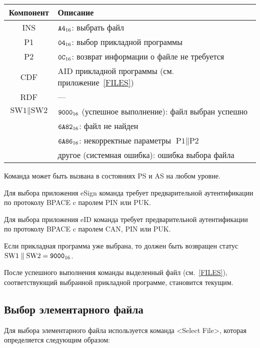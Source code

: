 \noindent
\begin{tabular}{|c|p{14cm}|}
\hline
Компонент & Описание \\
\hline
\hline
INS & $\texttt{A4}_{16}$: выбрать файл\\ 
\hline
P1 & $\texttt{04}_{16}$: выбор прикладной программы\\
\hline
P2 & $\texttt{0C}_{16}$: возврат информации о файле не требуется \\
\hline
CDF & AID прикладной программы (см. приложение~\ref{FILES})\\
\hline \hline
RDF &  --- \\
\hline
$\text{SW1}\parallel\text{SW2}$ & 
$\texttt{9000}_{16}$ (успешное выполнение): файл выбран успешно\\
 & $\texttt{6A82}_{16}$: файл не найден\\
 & $\texttt{6A86}_{16}$: некорректные параметры $\text{P1} \parallel \text{P2}$ \\
 & другое (системная ошибка): ошибка выбора файла\\
\hline
\end{tabular}

Команда может быть вызвана в состояниях PS и AS
на любом уровне.

Для выбора приложения eSign команда требует 
предварительной аутентификации по протоколу 
BPACE c паролем PIN или PUK.

Для выбора приложения eID команда требует 
предварительной аутентификации по протоколу BPACE c 
паролем CAN, PIN или PUK.

Если прикладная программа уже выбрана, то должен быть возвращен
статус $\text{SW1} \parallel \text{SW2} = \texttt{9000}_{16}$.

После успешного выполнения команды выделенный файл (см.~\ref{FILES}), 
соответствующий выбранной прикладной программе, становится текущим.

\subsection{Выбор элементарного файла}
\label{Oper.Descr.SelectEF}

Для выбора элементарного файла используется 
команда <Select File>, 
которая определяется следующим образом:

